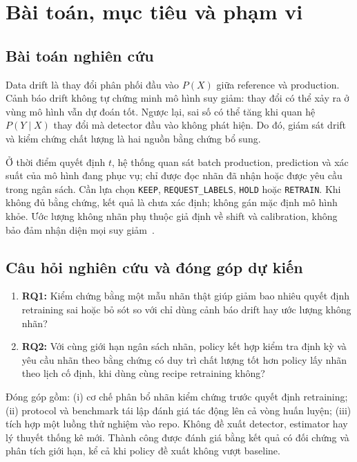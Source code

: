 \section{Bài toán, mục tiêu và phạm vi}
\subsection{Bài toán nghiên cứu}
Data drift là thay đổi phân phối đầu vào $P(X)$ giữa reference và production. Cảnh báo drift không tự chứng minh mô hình suy giảm: thay đổi có thể xảy ra ở vùng mô hình vẫn dự đoán tốt. Ngược lại, sai số có thể tăng khi quan hệ $P(Y\mid X)$ thay đổi mà detector đầu vào không phát hiện. Do đó, giám sát drift và kiểm chứng chất lượng là hai nguồn bằng chứng bổ sung.

Ở thời điểm quyết định $t$, hệ thống quan sát batch production, prediction và xác suất của mô hình đang phục vụ; chỉ được đọc nhãn đã nhận hoặc được yêu cầu trong ngân sách. Cần lựa chọn \texttt{KEEP}, \texttt{REQUEST\_LABELS}, \texttt{HOLD} hoặc \texttt{RETRAIN}. Khi không đủ bằng chứng, kết quả là chưa xác định; không gán mặc định mô hình khỏe. Ước lượng không nhãn phụ thuộc giả định về shift và calibration, không bảo đảm nhận diện mọi suy giảm~\cite{atc,cbpe}.

\subsection{Câu hỏi nghiên cứu và đóng góp dự kiến}
\begin{enumerate}
  \item \textbf{RQ1:} Kiểm chứng bằng một mẫu nhãn thật giúp giảm bao nhiêu quyết định retraining sai hoặc bỏ sót so với chỉ dùng cảnh báo drift hay ước lượng không nhãn?
  \item \textbf{RQ2:} Với cùng giới hạn ngân sách nhãn, policy kết hợp kiểm tra định kỳ và yêu cầu nhãn theo bằng chứng có duy trì chất lượng tốt hơn policy lấy nhãn theo lịch cố định, khi dùng cùng recipe retraining không?
\end{enumerate}
Đóng góp gồm: (i) cơ chế phân bổ nhãn kiểm chứng trước quyết định retraining; (ii) protocol và benchmark tái lập đánh giá tác động lên cả vòng huấn luyện; (iii) tích hợp một luồng thử nghiệm vào repo. Không đề xuất detector, estimator hay lý thuyết thống kê mới. Thành công được đánh giá bằng kết quả có đối chứng và phân tích giới hạn, kể cả khi policy đề xuất không vượt baseline.

